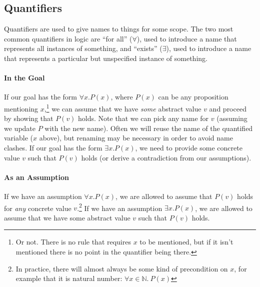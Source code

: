 \documentclass{tufte-handout}
\newcounter{example}
\begin{document}
\subsection{Quantifiers}

Quantifiers are used to give names to things for some scope.
The two most common quantifiers in logic are ``for all''
($\forall$), used to introduce a name that represents all
instances of something, and ``exists'' ($\exists$), used to
introduce a name that represents a particular but unspecified
instance of something.

\paragraph{In the Goal}
If our goal has the form $\forall x. P(x)$, where $P(x)$ can be
any proposition mentioning $x$,\footnote{Or not. There is no rule
  that requires $x$ to be mentioned, but if it isn't mentioned
  there is no point in the quantifier being there.} we can assume
that we have \emph{some} abstract value $v$ and proceed by showing
that $P(v)$ holds. Note that we can pick any name for $v$
(assuming we update $P$ with the new name). Often we will reuse
the name of the quantified variable ($x$ above), but renaming may
be necessary in order to avoid name clashes.
%
If our goal has the form $\exists x. P(x)$, we need to provide
some concrete value $v$ such that $P(v)$ holds (or derive a
contradiction from our assumptions).

\paragraph{As an Assumption}
If we have an assumption $\forall x. P(x)$, we are allowed to
assume that $P(v)$ holds for \emph{any} concrete value
$v$.\footnote{In practice, there will almost always be some kind of
  precondition on $x$, for example that it is natural number:
  $\forall x\in\mathbb{N}.~P(x)$}
%
If we have an assumption $\exists x. P(x)$, we are allowed to
assume that we have some abstract value $v$ such that $P(v)$
holds.
\end{document}
